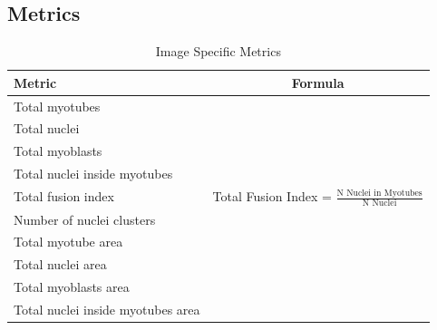 \subsection{Metrics}\label{secmetrics}
\begin{table}[H]
	\centering
	\label{tabimgspec}
	\caption{Image Specific Metrics}
	\begin{tabular}{|l|c|}
		\hline
		Metric & Formula \\
		\hline
		Total myotubes &  \\
		\hline
		Total nuclei &  \\
		\hline
		Total myoblasts &  \\
		\hline
		Total nuclei inside myotubes &  \\
		\hline
		Total fusion index & Total Fusion Index = $\frac{\text{N Nuclei in Myotubes}}{\text{N Nuclei}}$ \\
		\hline
		Number of nuclei clusters &  \\
		\hline
		Total myotube area &  \\
		\hline
		Total nuclei area &  \\
		\hline
		Total myoblasts area &  \\
		\hline
		Total nuclei inside myotubes area &  \\
		\hline
	\end{tabular}
\end{table}

